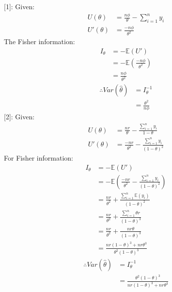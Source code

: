 \documentclass[a4paper]{article}
\begin{document}
	\subsection{}
		[1]:\newline
			Given:
				\begin{equation}
					\begin{split}
						U(\theta) &= \frac{n\phi}{\theta}-\sum_{i=1}^n y_i\\
						U'(\theta) &= \frac{-n\phi}{\theta^2}
					\end{split}
				\end{equation}
			The Fisher information:
				\begin{equation*}
					\begin{split}
					I_\theta &= -\mathbb{E}(U')\\
					&= -\mathbb{E}\left(\frac{-n\phi}{\theta^2}\right)\\
					&= \frac{n\phi}{\theta^2}
					\end{split}
				\end{equation*}
			\begin{equation*}
				\begin{split}
					\therefore Var(\hat{\theta}) &= I_\theta^{-1}\\
					&= \frac{\theta^2}{n\phi}
				\end{split}
			\end{equation*}
		[2]:\newline
			Given:
				\begin{equation*}
					\begin{split}
						U(\theta) &= \frac{nr}{\theta} - \frac{\sum_{i=1}^n y_i}{1-\theta}\\
						U'(\theta) &= \frac{-nr}{\theta^2} - \frac{\sum_{i=1}^n y_i}{(1-\theta)^2}
					\end{split}
				\end{equation*}
			For Fisher information:
				\begin{equation*}
					\begin{split}
						I_\theta &= -\mathbb{E}(U')\\
						&= -\mathbb{E}\left(\frac{-nr}{\theta^2} - \frac{\sum_{i=1}^n y_i}{(1-\theta)^2}\right)\\
						&= \frac{nr}{\theta^2} + \frac{\sum_{i=1}^n \mathbb{E}(y_i)}{(1-\theta)^2}\\
						&= \frac{nr}{\theta^2} + \frac{\sum_{i=1}^n \theta r}{(1-\theta)^3}\\
						&= \frac{nr}{\theta^2} + \frac{nr\theta}{(1-\theta)^3}\\
						&= \frac{nr(1-\theta)^3+nr\theta^3}{\theta^2(1-\theta)^3}
					\end{split}
				\end{equation*}
			\begin{equation*}
				\begin{split}
					\therefore Var(\hat{\theta}) &= I_\theta^{-1}\\
					&= \frac{\theta^2(1-\theta)^3}{nr(1-\theta)^3+nr\theta^3}
				\end{split}
			\end{equation*}
\end{document}
